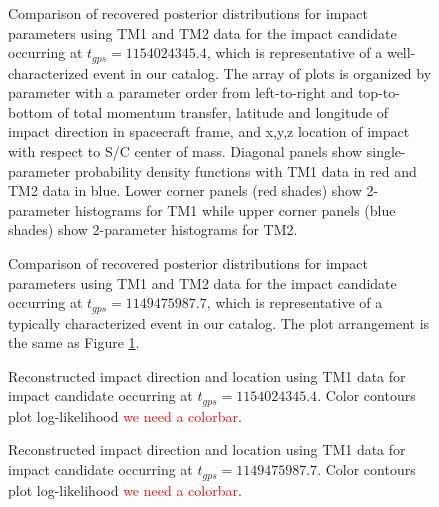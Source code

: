 \documentclass[twocolumn, trackchanges]{aastex62}
\newcommand{\red}[1]{\textcolor{red}{#1}}
\begin{document}
\begin{figure}[ht!]
\vspace*{-20mm}
\caption{Comparison of recovered posterior distributions for impact parameters using TM1 and TM2 data for the impact candidate occurring at $t_{gps}=1154024345.4$, which is representative of a well-characterized event in our catalog. The array of plots is organized by parameter with a parameter order from left-to-right and top-to-bottom of total momentum transfer, latitude and longitude of impact direction in  spacecraft frame, and x,y,z location of impact with respect to S/C center of mass. Diagonal panels show single-parameter probability density functions with TM1 data in red and TM2 data in blue. Lower corner panels (red shades) show 2-parameter histograms for TM1 while upper corner panels (blue shades) show 2-parameter histograms for TM2. \label{fig:goodExampleCorner}}
\end{figure}

\begin{figure}[ht!]
\vspace*{-20mm}
\caption{Comparison of recovered posterior distributions for impact parameters using TM1 and TM2 data for the impact candidate occurring at $t_{gps}=1149475987.7$, which is representative of a typically characterized event in our catalog. The plot arrangement is the same as Figure \ref{fig:goodExampleCorner}.\label{fig:typExampleCorner}}
\end{figure}

\begin{figure}[h!]
\caption{Reconstructed impact direction and location using TM1 data for impact candidate occurring at $t_{gps}=1154024345.4$. Color contours plot log-likelihood \red{we need a colorbar}.\label{fig:goodExampleLocation}}
\end{figure}

\begin{figure}[h!]
\caption{Reconstructed impact direction and location using TM1 data for impact candidate occurring at $t_{gps}=1149475987.7$. Color contours plot log-likelihood \red{we need a colorbar}.\label{fig:typExampleLocation}}
\end{figure}
\end{document}
